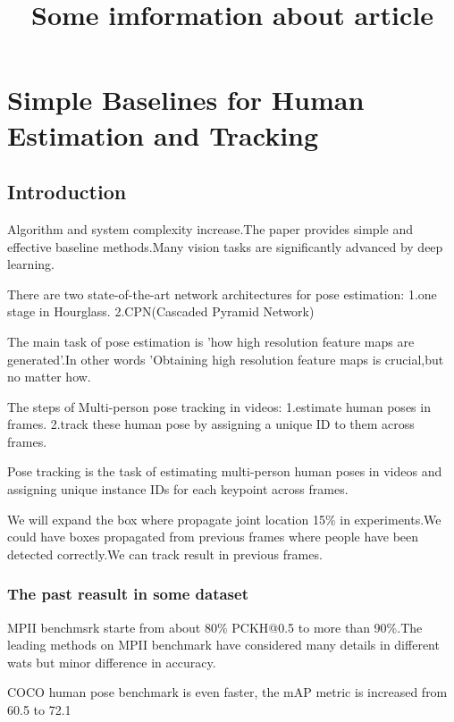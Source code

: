 \documentclass[11pt]{article}
\begin{document}
	\title{Some imformation about article}
	
	\maketitle
	
	\newpage
	\tableofcontents
	\newpage

\section{Simple Baselines for Human Estimation and Tracking}
\subsection{Introduction}

Algorithm and system complexity increase.The paper provides simple and effective baseline methods.Many vision tasks are significantly advanced by deep learning.

There are two state-of-the-art network architectures for pose estimation:
1.one stage in Hourglass.
2.CPN(Cascaded Pyramid Network)

The main task of pose estimation is 'how high resolution feature maps are generated'.In other words 'Obtaining high resolution feature maps is crucial,but no matter how.

The steps of Multi-person pose tracking in videos:
1.estimate human poses in frames.
2.track these human pose by assigning a unique ID to them across frames.

Pose tracking is the task of estimating multi-person human poses in videos and assigning unique instance IDs for each keypoint across frames.

We will expand the box where propagate joint location 15\% in experiments.We could have boxes propagated from previous frames where people have been detected correctly.We can track result in previous frames.


\subsubsection{The past reasult in some dataset}

MPII benchmsrk starte from about 80\% PCKH@0.5 to more than 90\%.The leading methods on MPII benchmark have considered many details in different wats but minor difference in accuracy.

COCO human pose benchmark is even faster, the mAP metric is increased from 60.5 to 72.1
\end{document}
